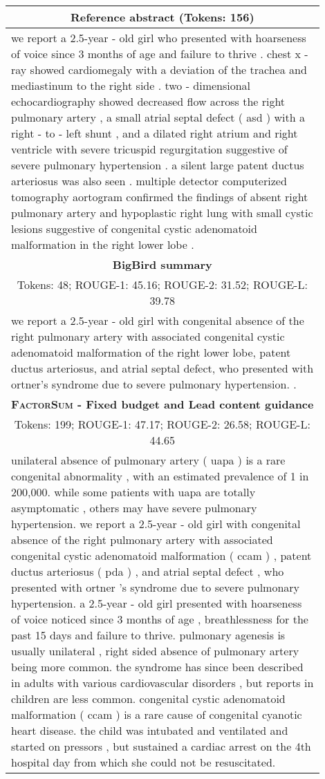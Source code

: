 \documentclass[11pt,table]{article}
\newcommand{\modelname}{FactorSum}
\begin{document}
\begin{table*}[ht]
  \centering
  \begin{tabular}{p{0.9\linewidth}}
    \toprule
    \multicolumn{1}{c}{\textbf{Reference abstract} (Tokens: 156)} \\
    \midrule
    we report a 2.5-year - old girl who presented with hoarseness of voice since 3 months of age and failure to thrive . chest x - ray showed cardiomegaly with a deviation of the trachea and mediastinum to the right side . two - dimensional echocardiography showed decreased flow across the right pulmonary artery , a small atrial septal defect ( asd ) with a right - to - left shunt , and a dilated right atrium and right ventricle with severe tricuspid regurgitation suggestive of severe pulmonary hypertension . a silent large patent ductus arteriosus was also seen . multiple detector computerized tomography aortogram confirmed the findings of absent right pulmonary artery and hypoplastic right lung with small cystic lesions suggestive of congenital cystic adenomatoid malformation in the right lower lobe .\\
    \midrule
    \multicolumn{1}{c}{\textbf{BigBird summary}} \\
    \multicolumn{1}{c}{Tokens: 48; ROUGE-1: 45.16; ROUGE-2: 31.52; ROUGE-L: 39.78} \\
    \midrule
    we report a 2.5-year - old girl with congenital absence of the right pulmonary artery with associated congenital cystic adenomatoid malformation of the right lower lobe, patent ductus arteriosus, and atrial septal defect, who presented with ortner's syndrome due to severe pulmonary hypertension. .\\
    \midrule
    \multicolumn{1}{c}{\textbf{\textsc{\modelname} - Fixed budget and Lead content guidance}} \\
    \multicolumn{1}{c}{Tokens: 199; ROUGE-1: 47.17; ROUGE-2: 26.58; ROUGE-L: 44.65} \\
    \midrule
     unilateral absence of pulmonary artery ( uapa ) is a rare congenital abnormality , with an estimated prevalence of 1 in 200,000. while some patients with uapa are totally asymptomatic , others may have severe pulmonary hypertension. we report a 2.5-year - old girl with congenital absence of the right pulmonary artery with associated congenital cystic adenomatoid malformation ( ccam ) , patent ductus arteriosus ( pda ) , and atrial septal defect , who presented with ortner 's syndrome due to severe pulmonary hypertension. a 2.5-year - old girl presented with hoarseness of voice noticed since 3 months of age , breathlessness for the past 15 days and failure to thrive. pulmonary agenesis is usually unilateral , right sided absence of pulmonary artery being more common. the syndrome has since been described in adults with various cardiovascular disorders , but reports in children are less common. congenital cystic adenomatoid malformation ( ccam ) is a rare cause of congenital cyanotic heart disease. the child was intubated and ventilated and started on pressors , but sustained a cardiac arrest on the 4th hospital day from which she could not be resuscitated.\\

\end{tabular}
\end{table*}
\end{document}
